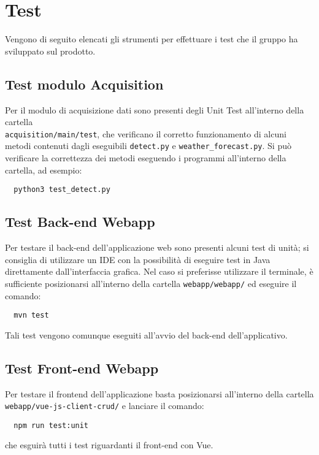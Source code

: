 \chapter{Test}\label{Test}
Vengono di seguito elencati gli strumenti per effettuare i test che il gruppo ha sviluppato sul prodotto.

\section{Test modulo Acquisition}\label{TestModuloAcquisition}
Per il modulo di acquisizione dati sono presenti degli Unit Test all'interno della cartella \\ \texttt{acquisition/main/test}, che verificano il corretto funzionamento di alcuni metodi contenuti dagli eseguibili \texttt{detect.py} e \texttt{weather\_forecast.py}.
Si può verificare la correttezza dei metodi eseguendo i programmi all'interno della cartella, ad esempio:
\begin{lstlisting}
  python3 test_detect.py
\end{lstlisting}

\section{Test Back-end Webapp}\label{TestBackendWebapp}
Per testare il back-end dell'applicazione web sono presenti alcuni test di unità; si consiglia di utilizzare un IDE con la possibilità di eseguire test in Java direttamente dall'interfaccia grafica.
Nel caso si preferisse utilizzare il terminale, è sufficiente posizionarsi all'interno della cartella \texttt{webapp/webapp/} ed eseguire il comando:
\begin{lstlisting}
  mvn test
\end{lstlisting}
Tali test vengono comunque eseguiti all'avvio del back-end dell'applicativo.

\section{Test Front-end Webapp}\label{TestFrontendWebapp}
Per testare il frontend dell'applicazione basta posizionarsi all'interno della cartella \\ \texttt{webapp/vue-js-client-crud/} e lanciare il comando:
\begin{lstlisting}
  npm run test:unit
\end{lstlisting}
che esguirà tutti i test riguardanti il front-end con Vue.
